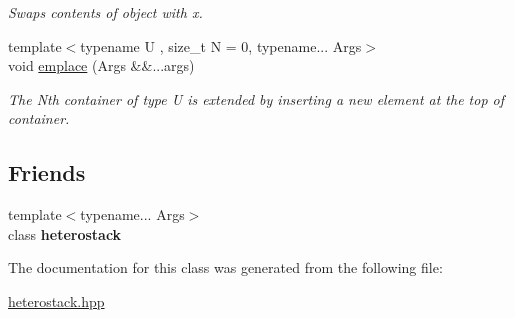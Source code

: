 \begin{DoxyCompactItemize}
\begin{DoxyCompactList}\small\item\em Swaps contents of object with x. \end{DoxyCompactList}\item 
\hypertarget{classheterogeneous_1_1heterostack_3_01_t_00_01_types_8_8_8_4_ac47a8a2f83f465409c2af6704ac168be}{}{\footnotesize template$<$typename U , size\+\_\+t N = 0, typename... Args$>$ }\\void \hyperlink{classheterogeneous_1_1heterostack_3_01_t_00_01_types_8_8_8_4_ac47a8a2f83f465409c2af6704ac168be}{emplace} (Args \&\&...args)\label{classheterogeneous_1_1heterostack_3_01_t_00_01_types_8_8_8_4_ac47a8a2f83f465409c2af6704ac168be}

\begin{DoxyCompactList}\small\item\em The Nth container of type U is extended by inserting a new element at the top of container. \end{DoxyCompactList}\end{DoxyCompactItemize}
\subsection*{Friends}
\begin{DoxyCompactItemize}
\item 
\hypertarget{classheterogeneous_1_1heterostack_3_01_t_00_01_types_8_8_8_4_a7f84cf71b111c50ffd6615df66add18e}{}{\footnotesize template$<$typename... Args$>$ }\\class {\bfseries heterostack}\label{classheterogeneous_1_1heterostack_3_01_t_00_01_types_8_8_8_4_a7f84cf71b111c50ffd6615df66add18e}

\end{DoxyCompactItemize}


The documentation for this class was generated from the following file\+:\begin{DoxyCompactItemize}
\item 
\hyperlink{heterostack_8hpp}{heterostack.\+hpp}\end{DoxyCompactItemize}
